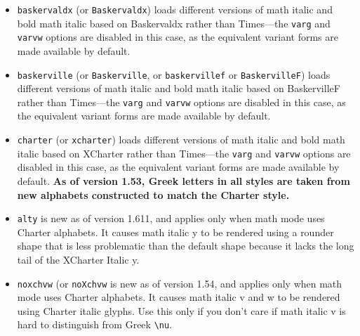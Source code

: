 \documentclass[11pt]{article}
\theoremstyle{oldplain}
\theoremstyle{plain}
\begin{document}
\begin{itemize}
\item {\tt baskervaldx} (or {\tt Baskervaldx}) loads different versions of math italic and bold math italic based on \textsf{Baskervaldx} rather than \textsf{Times}---the {\tt varg} and {\tt varvw} options are disabled in this case, as the equivalent variant forms are made available by default.
\item {\tt baskerville} (or {\tt Baskerville}, or {\tt baskervillef} or {\tt BaskervilleF}) loads different versions of math italic and bold math italic based on \textsf{BaskervilleF} rather than \textsf{Times}---the {\tt varg} and {\tt varvw} options are disabled in this case, as the equivalent variant forms are made available by default.
\item {\tt charter} (or {\tt xcharter}) loads different versions of math italic and bold math italic based on \textsf{XCharter} rather than \textsf{Times}---the {\tt varg} and {\tt varvw} options are disabled in this case, as the equivalent variant forms are made available by default. \textbf{As of version 1.53, Greek letters in all styles are taken from  new alphabets constructed to match the Charter style.}
\item {\tt alty}  is new as of version 1.611, and applies only when math mode uses Charter alphabets. It causes math italic y to be rendered using a rounder shape that is less problematic than the default shape because it lacks the long tail of the XCharter Italic {y}.
\item {\tt noxchvw} (or {\tt noXchvw} is new as of version 1.54, and applies only when math mode uses Charter alphabets. It causes math italic v and w to be rendered using Charter italic glyphs. Use this only if you don't care if math italic v is hard to distinguish from Greek \verb|\nu|.


\end{itemize}
\end{document}
